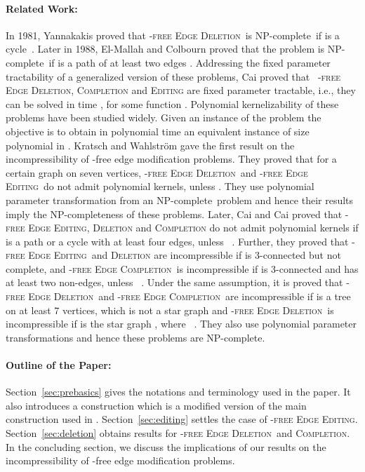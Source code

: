 \documentclass[envcountsame,envcountsect,10pt,oribibl]{llncs}
\newcommand{\pname}[1]{\textnormal{\textsc{#1}}}
\newcommand{\cclass}[1]{\textnormal{\textsf{#1}}}
\newcommand{\HED}{\pname{-free Edge Deletion}}
\newcommand{\HEC}{\pname{-free Edge Completion}}
\newcommand{\HEE}{\pname{-free Edge Editing}}
\newcommand{\NPC}{\cclass{NP-complete}}
\newcommand{\PH}{}
\begin{document}
\paragraph{\textbf{Related Work:}}
In 1981, Yannakakis proved that \HED\ is \NPC\
if  is a cycle~\cite{DBLP:journals/siamcomp/Yannakakis81}. 
Later in 1988, El-Mallah and Colbourn proved that the problem
is \NPC\ if  is a path of at least two edges \cite{el1988complexity}.
Addressing the fixed parameter tractability of a generalized version of these problems,
Cai proved that \cite{DBLP:journals/ipl/Cai96}~\HED, \textsc{Completion} and \textsc{Editing}
are fixed parameter tractable, i.e., they can be solved in time
, for some function . 
Polynomial kernelizability of these problems
have been studied widely. 
Given an instance  of the problem the objective is to 
obtain in polynomial time an equivalent instance of size
polynomial in . Kratsch and Wahlstr{\"o}m gave the first result on the incompressibility of 
-free edge modification problems. They proved that \cite{kratsch2009two} for a certain graph 
on seven vertices, \HED\ and \HEE\ do not admit polynomial kernels, unless \PH. They use
polynomial parameter transformation from an \NPC\ problem and hence their results imply the NP-completeness
of these problems. Later, Cai and Cai proved that 
\HEE, \textsc{Deletion} and \textsc{Completion} do not admit polynomial kernels
if  is a path or a cycle with at least four edges, unless \PH~\cite{DBLP:journals/algorithmica/CaiC15}.
Further, they proved that \HEE\ and \textsc{Deletion} are incompressible if  is 3-connected but not complete, 
and \HEC\ is incompressible if  is 3-connected and has at least two non-edges,
unless \PH~\cite{DBLP:journals/algorithmica/CaiC15}.
Under the same assumption, 
it is proved that \HED\ and \HEC\ are incompressible if  is a tree on at least 7 vertices, which is not a star graph and
\HED\ is incompressible if  is the star graph , where ~\cite{cai2012polynomial}.
They also use polynomial parameter transformations and hence these problems
are \NPC. 



\paragraph{\textbf{Outline of the Paper:}}
Section~\ref{sec:prebasics} gives the notations and terminology used in the paper.
It also introduces a construction which is a modified version of the main
construction used in \cite{DBLP:conf/cocoa/AravindSS15}.
Section~\ref{sec:editing} settles the case of \HEE.
Section~\ref{sec:deletion} obtains results for \HED\ and \textsc{Completion}.
In the concluding section, we discuss the implications of our results on the 
incompressibility of -free edge modification problems. 
\end{document}
